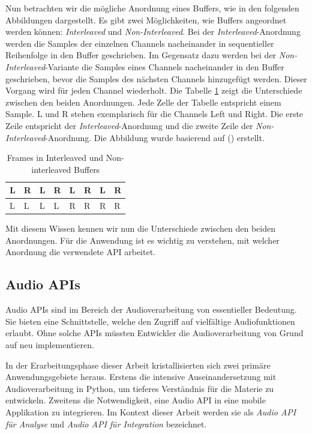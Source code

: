 \documentclass[11pt,a4paper]{article}
\begin{document}
\noindent \newline
Nun betrachten wir die mögliche Anordnung eines Buffers, wie in den folgenden Abbildungen
dargestellt. Es gibt zwei Möglichkeiten, wie Buffers angeordnet werden
können: \textit{Interleaved} und \textit{Non-Interleaved}. Bei der \textit{Interleaved}-Anordnung
werden die Samples der einzelnen Channels nacheinander in sequentieller Reihenfolge in den Buffer
geschrieben. Im Gegensatz dazu werden bei der \textit{Non-Interleaved}-Variante die Samples
eines Channels nacheinander in den Buffer geschrieben, bevor die Samples des nächsten Channels
hinzugefügt werden. Dieser Vorgang wird für jeden Channel wiederholt. Die Tabelle
\ref{tab:frames_buffers} zeigt die Unterschiede zwischen den beiden Anordnungen. Jede Zelle der
Tabelle entspricht einem Sample. L und R stehen exemplarisch für die Channels Left und Right.
Die erste Zeile entspricht der \textit{Interleaved}-Anordnung und die zweite Zeile der
\textit{Non-Interleaved}-Anordnung. Die Abbildung wurde basierend auf
(\cite[p.11]{somberg2019audioapi}) erstellt.

\begin{table}[h]
	\centering
	\begin{tabularx}{\textwidth}{|X|X|X|X|X|X|X|X|}
		\hline
		L & R & L & R & L & R & L & R \\
		\hline
		L & L & L & L & R & R & R & R \\
		\hline
	\end{tabularx}
	\caption{Frames in Interleaved und Non-interleaved Buffers}
	\label{tab:frames_buffers}
\end{table}

\noindent
Mit diesem Wissen kennen wir nun die Unterschiede zwischen den beiden Anordnungen. Für die
Anwendung ist es wichtig zu verstehen, mit welcher Anordnung die verwendete API arbeitet.

\subsection{Audio APIs}
Audio APIs sind im Bereich der Audioverarbeitung von essentieller Bedeutung. Sie bieten eine
Schnittstelle, welche den Zugriff auf vielfältige Audiofunktionen erlaubt. Ohne solche APIs müssten
Entwickler die Audioverarbeitung von Grund auf neu implementieren.

\noindent \newline
In der Erarbeitungsphase dieser Arbeit kristallisierten sich zwei primäre Anwendungsgebiete heraus.
Erstens die intensive Auseinandersetzung mit Audioverarbeitung in Python, um tieferes Verständnis
für die Materie zu entwickeln. Zweitens die Notwendigkeit, eine Audio API in eine mobile
Applikation zu integrieren. Im Kontext dieser Arbeit werden sie als \textit{Audio API für Analyse}
und \textit{Audio API für Integration} bezeichnet.
\end{document}
